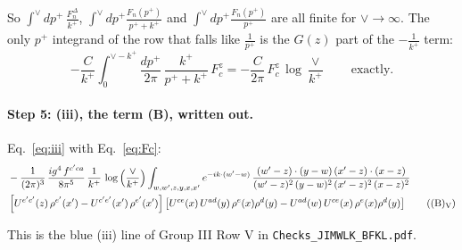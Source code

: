 \documentclass[10pt]{article}
\numberwithin{equation}{section}
\begin{document}
So $\int^{\vee}dp^+\,\frac{F_n^\Delta}{k^+}$, $\int^\vee dp^+\frac{F_n(p^+)}{p^++k^+}$ and $\int^\vee dp^+\frac{F_n(p^+)}{p^+}$ are all finite for $\vee\to\infty$. The only $p^+$ integrand of the row that falls like $\frac{1}{p^+}$ is the $G(z)$ part of the $-\frac{1}{k^+}$ term:
\begin{equation}
-\frac{C}{k^+}\int_0^{\vee-k^+}\frac{dp^+}{2\pi}\,\frac{k^+}{p^++k^+}\,F_c^z=-\frac{C}{2\pi}\,F_c^z\,\log\frac{\vee}{k^+}\qquad\text{exactly}.
\label{eq:iii}
\end{equation}

\paragraph{Step 5: (iii), the term (B), written out.} Eq.~\eqref{eq:iii} with Eq.~\eqref{eq:Fc}:
\begin{align}
&-\frac{1}{(2\pi)^{3}}\, \frac{ig^{4}\,f^{c'ca}}{8\pi^{5}}\, \frac{1}{k^{+}}\,\log{\left(\frac{\vee}{k^{+}}\right)}\int_{w,w',z,y,x,x'} e^{-ik\cdot (w'-w)}\,\frac{(w'-z)\cdot (y-w)\,(x'-z)\cdot (x-z)}{(w'-z)^{2}\,(y-w)^{2}\,(x'-z)^{2}\,(x-z)^{2}}\notag \\
& \left[U^{e'c'}(z)\,\rho^{e'}(x')-U^{c'e'}(x')\,\rho^{e'}(x')\right]\left[U^{ce}(x)\,U^{ad}(y)\,\rho^{e}(x)\rho^{d}(y)-U^{ad}(w)\,U^{ce}(x)\,\rho^{e}(x)\rho^{d}(y)\right]\tag{(B)$_{\rm V}$}
\end{align}

This is the blue (iii) line of Group III Row V in \texttt{Checks\_JIMWLK\_BFKL.pdf}.
\end{document}
